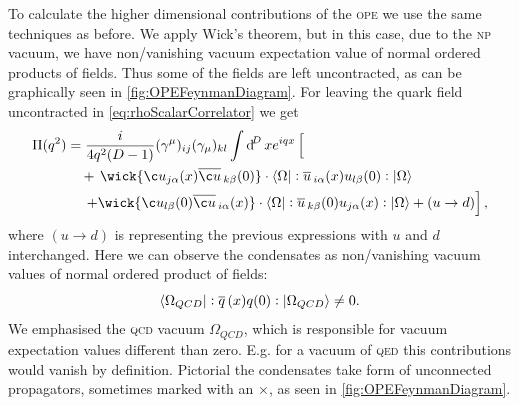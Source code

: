 \documentclass[../../index.tex]{subfiles}
\begin{document}
To calculate the higher dimensional contributions of the \textsc{ope} we use the
same techniques as before. We apply Wick's theorem, but in this case, due to the
\textsc{np} vacuum, we have non\-/vanishing vacuum expectation value of normal
ordered products of fields. Thus some of the fields are left uncontracted, as
can be graphically seen in \cref{fig:OPEFeynmanDiagram}. For leaving the quark
field uncontracted in \cref{eq:rhoScalarCorrelator} we get
\begin{equation}
  \begin{split}
    \Pi(q^2) &= \frac{i}{4q^2(D-1)} (\gamma^\mu)_{ij} (\gamma_\mu)_{kl} \int \dif^D x e^{iqx} \left[ \phantom{\wick{ \c u_{j \alpha}(x) \anti{\c u}_{k \beta}(0)}} \right.\\
    &\quad+\,\wick{ \c u_{j \alpha}(x) \anti{\c u}_{k \beta}(0)} \cdot \langle \Omega \vert : \anti{u}_{i \alpha}(x) u_{l \beta} (0) :\vert \Omega \rangle \\
    &\quad\,\left.+\wick{\c u_{l \beta}(0) \anti{\c u}_{i \alpha}(x)} \cdot
      \langle \Omega \vert: \anti{u}_{k \beta}(0) u_{j \alpha}(x) : \vert \Omega
      \rangle + (u \to d) \right],
  \end{split}
\end{equation}
where \((u\to d)\) is representing the previous expressions with \(u\) and \(d\)
interchanged. Here we can observe the condensates as non\-/vanishing vacuum
values of normal ordered product of fields:
\begin{equation}
  \langle\Omega_{QCD}\vert: \overline{q}\,(x) q(0) :\vert\Omega_{QCD}\rangle \neq 0.
\end{equation}
We emphasised the \textsc{qcd} vacuum \(\Omega_{QCD}\), which is responsible for
vacuum expectation values different than zero. E.g. for a vacuum of \textsc{qed}
this contributions would vanish by definition. Pictorial the condensates take
form of unconnected propagators, sometimes marked with an \(\times\), as seen in
\cref{fig:OPEFeynmanDiagram}.
\end{document}
